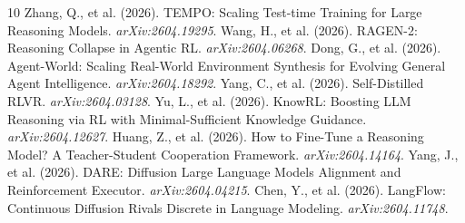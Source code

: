 \documentclass[11pt]{article}
\begin{document}
\begin{thebibliography}{10}
 Zhang, Q., et al. (2026). TEMPO: Scaling Test-time Training for Large Reasoning Models. \textit{arXiv:2604.19295}.
 Wang, H., et al. (2026). RAGEN-2: Reasoning Collapse in Agentic RL. \textit{arXiv:2604.06268}.
 Dong, G., et al. (2026). Agent-World: Scaling Real-World Environment Synthesis for Evolving General Agent Intelligence. \textit{arXiv:2604.18292}.
 Yang, C., et al. (2026). Self-Distilled RLVR. \textit{arXiv:2604.03128}.
 Yu, L., et al. (2026). KnowRL: Boosting LLM Reasoning via RL with Minimal-Sufficient Knowledge Guidance. \textit{arXiv:2604.12627}.
 Huang, Z., et al. (2026). How to Fine-Tune a Reasoning Model? A Teacher-Student Cooperation Framework. \textit{arXiv:2604.14164}.
 Yang, J., et al. (2026). DARE: Diffusion Large Language Models Alignment and Reinforcement Executor. \textit{arXiv:2604.04215}.
 Chen, Y., et al. (2026). LangFlow: Continuous Diffusion Rivals Discrete in Language Modeling. \textit{arXiv:2604.11748}.
\end{thebibliography}
\end{document}
